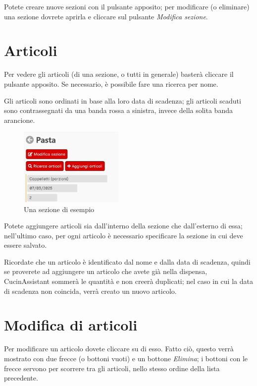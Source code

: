\documentclass[12pt, a4paper]{report}
\begin{document}
    Potete creare nuove sezioni con il pulsante apposito; per modificare (o eliminare) una sezione dovrete aprirla e cliccare sul pulsante
    \emph{Modifica sezione}.

    \section{Articoli}

	Per vedere gli articoli (di una sezione, o tutti in generale) basterà cliccare il pulsante apposito. Se necessario, è possibile fare una ricerca
	per nome.

    Gli articoli sono ordinati in base alla loro data di scadenza; gli articoli scaduti sono contrassegnati da una banda rossa a sinistra, invece
    della solita banda arancione.

    \begin{figure}[H]
        \centering
        \includegraphics[width=0.45\textwidth]{assets/it/articles.png}
        \caption{Una sezione di esempio}
    \end{figure}

    Potete aggiungere articoli sia dall'interno della sezione che dall'esterno di essa; nell'ultimo caso, per ogni articolo è necessario specificare
    la sezione in cui deve essere salvato.

    Ricordate che un articolo è identificato dal nome e dalla data di scadenza, quindi se proverete ad aggiungere un articolo che avete già nella
    dispensa, CucinAssistant sommerà le quantità e non creerà duplicati; nel caso in cui la data di scadenza non coincida, verrà creato un nuovo
    articolo.

    \section{Modifica di articoli}

    Per modificare un articolo dovete cliccare su di esso. Fatto ciò, questo verrà mostrato con due frecce (o bottoni vuoti) e un bottone
    \emph{Elimina}; i bottoni con le frecce servono per scorrere tra gli articoli, nello stesso ordine della lista precedente.
\end{document}
